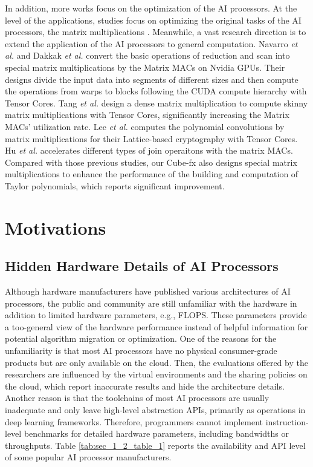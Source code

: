 \documentclass[12pt]{extbook}
\begin{document}
In addition, more works focus on the optimization of the AI processors. At the level of the applications, studies focus on optimizing the original tasks of the AI processors, the matrix multiplications \cite{gccblas, oneapi, 9820727, 9139835}. Meanwhile, a vast research direction is to extend the application of the AI processors to general computation. Navarro \textit{et al.} \cite{DBLP:conf/sccc/CarrascoVN18} and Dakkak \textit{et al.} \cite{DBLP:conf/ics/DakkakLXGH19} convert the basic operations of reduction and scan into special matrix multiplications by the Matrix MACs on Nvidia GPUs. Their designs divide the input data into segments of different sizes and then compute the operations from warps to blocks following the CUDA compute hierarchy with Tensor Cores. Tang \textit{et al.} \cite{DBLP:conf/ic-nc/TangK0K20} design a dense matrix multiplication to compute skinny matrix multiplications with Tensor Cores, significantly increasing the Matrix MACs' utilization rate. Lee \textit{et al.} \cite{DBLP:journals/access/LeeSZH22} computes the polynomial convolutions by matrix multiplications for their Lattice-based cryptography with Tensor Cores. Hu \textit{et al.} \cite{10.1145/3514221.3517869} accelerates different types of join operaitons with the matrix MACs. Compared with those previous studies, our Cube-fx also designs special matrix multiplications to enhance the performance of the building and computation of Taylor polynomials, which reports significant improvement.

\section{Motivations}
\label{sec_1_2_motivations}

\subsection{Hidden Hardware Details of AI Processors}

Although hardware manufacturers have published various architectures of AI processors, the public and community are still unfamiliar with the hardware in addition to limited hardware parameters, e.g., FLOPS. These parameters provide a too-general view of the hardware performance instead of helpful information for potential algorithm migration or optimization. One of the reasons for the unfamiliarity is that most AI processors have no physical consumer-grade products but are only available on the cloud. Then, the evaluations offered by the researchers are influenced by the virtual environments and the sharing policies on the cloud, which report inaccurate results and hide the architecture details. Another reason is that the toolchains of most AI processors are usually inadequate and only leave high-level abstraction APIs, primarily as operations in deep learning frameworks. Therefore, programmers cannot implement instruction-level benchmarks for detailed hardware parameters, including bandwidths or throughputs. Table \ref{tab:sec_1_2_table_1} reports the availability and API level of some popular AI processor manufacturers.
\end{document}
